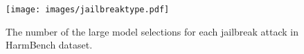 \begin{figure}[t]
\medskip
\centering
\texttt{[image: images/jailbreaktype.pdf]}
\vspace{-0.5em}
\caption{The number of the large model selections for each jailbreak attack in HarmBench dataset.}
\label{fig:jailbreaktype}
\vspace{-0.15in}
\end{figure}